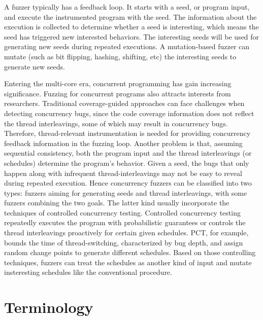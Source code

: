 A fuzzer typically has a feedback loop. It starts with a seed, or program input, and execute the instrumented program with the seed. The information about the execution is collected to determine whether a seed is interesting, which means the seed has triggered new interested behaviors. The interesting seeds will be used for generating new seeds during repeated executions. A mutation-based fuzzer can mutate (such as bit flipping, hashing, shifting, etc) the interesting seeds to generate new seeds. 


Entering the multi-core era, concurrent programming has gain increasing significance. Fuzzing for concurrent programs also attracts interests from researchers. Traditional coverage-guided approaches can face challenges when detecting concurrency bugs, since the code coverage information does not reflect the thread interleavings, some of which may result in concurrency bugs. Therefore, thread-relevant instrumentation is needed for providing concurrency feedback information in the fuzzing loop. Another problem is that, assuming sequential consistency, both the program input and the thread interleavings (or schedules) determine the program's behavior. Given a seed, the bugs that only happen along with infrequent thread-interleavings may not be easy to reveal during repeated execution. Hence concurrency fuzzers can be classified into two types: fuzzers aiming for generating seeds and thread interleavings, with some fuzzers combining the two goals. The latter kind usually incorporate the techniques of controlled concurrency testing. Controlled concurrency testing repeatedly executes the program with probabilistic guarantees or controls the thread interleavings proactively for certain given schedules. PCT, for example, bounds the time of thread-switching, characterized by bug depth, and assign random change points to generate different schedules. Based on those controlling techniques, fuzzers can treat the schedules as another kind of input and mutate insteresting schedules like the conventional procedure. 



















\section{Terminology}


